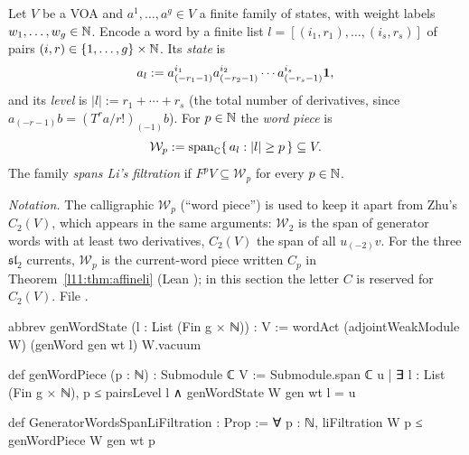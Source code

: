 \begin{definition}\label{l11:def:genwordpiece}
Let $V$ be a VOA and $a^1,\dots,a^g\in V$ a finite family of states, with weight labels $w_1,\dots,w_g\in{\mathbb{N}}$. Encode
a word by a finite list $l = [(i_1,r_1),\dots,(i_s,r_s)]$ of pairs $(i,r)\in\{1,\dots,g\}\times{\mathbb{N}}$. Its
\emph{state} is
\begin{equation*}
  a_l := a^{i_1}_{(-r_1-1)}a^{i_2}_{(-r_2-1)}\cdots a^{i_s}_{(-r_s-1)}\mathbf{1} ,
\end{equation*}
and its \emph{level} is $|l| := r_1+\cdots+r_s$ (the total number of derivatives, since
$a_{(-r-1)}b = (T^ra/r!)_{(-1)}b$). For $p\in{\mathbb{N}}$ the \emph{word piece} is
\begin{equation*}
  \mathcal W_p := \operatorname{span}_{\mathbb{C}}\{\,a_l : |l|\ge p\,\}\subseteq V .
\end{equation*}
The family \emph{spans Li's filtration} if $F^pV\subseteq \mathcal W_p$ for every $p\in{\mathbb{N}}$.
\end{definition}
\noindent\emph{Notation.} The calligraphic $\mathcal W_p$ (``word piece'') is used to keep it apart from Zhu's
$C_2(V)$, which appears in the same arguments: $\mathcal W_2$ is the span of generator words with at least two
derivatives, $C_2(V)$ the span of all $u_{(-2)}v$. For the three $\mathfrak{sl}_2$ currents, $\mathcal W_p$ is the
current-word piece written $C_p$ in Theorem~\ref{l11:thm:affineli} (Lean ); in this section the
letter $C$ is reserved for $C_2(V)$.
\noindent File .
\begin{leancode}
abbrev genWordState (l : List (Fin g × ℕ)) : V :=
  wordAct (adjointWeakModule W) (genWord gen wt l) W.vacuum

def genWordPiece (p : ℕ) : Submodule ℂ V :=
  Submodule.span ℂ {u | ∃ l : List (Fin g × ℕ), p ≤ pairsLevel l ∧ genWordState W gen wt l = u}

def GeneratorWordsSpanLiFiltration : Prop :=
  ∀ p : ℕ, liFiltration W p ≤ genWordPiece W gen wt p
\end{leancode}


